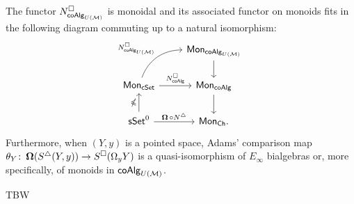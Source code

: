 \begin{theorem} \label{t:1st main thm in the intro}
    The functor $N^{\square}_{\mathsf{coAlg}_{U(\mathcal{M})}}$ is monoidal and its associated functor on monoids fits in the following diagram commuting up to a natural isomorphism:
    \begin{equation*}
    \begin{tikzcd}
    & \Mon_{\coAlg_{U(\M)}} \arrow[d] \\
    \Mon_{\cSet} \arrow[ru, "\cchains_{\coAlg_{U(\M)}}", out=70, in=180] \arrow[r, "\cchains_\coAlg"]
    & \Mon_{\coAlg} \arrow[d] \\
    \sSet^0 \arrow[r, "\cobar \circ \schains"] \arrow[u, "\gcobar"]
    & \Mon_{\Ch}.
    \end{tikzcd}
    \end{equation*}
    Furthermore, when $(Y, y)$ is a pointed space, Adams' comparison map $\theta_Y \colon \operatorname{\mathbf{\Omega}}(S^{\triangle}(Y, y)) \to S^{\square}(\Omega_y Y)$ is a quasi-isomorphism of $E_\infty$ bialgebras or, more specifically, of monoids in $\mathsf{coAlg}_{U(\mathcal{M})}$.
\end{theorem} 



TBW

